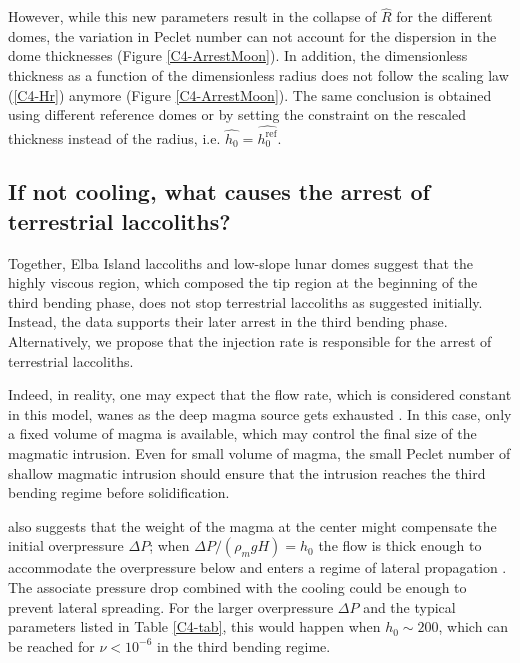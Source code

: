 However, while this new parameters result in the collapse of $\hat{R}$
for  the different  domes,  the  variation in  Peclet  number can  not
account   for  the   dispersion  in   the  dome   thicknesses  (Figure
\ref{C4-ArrestMoon}).  In  addition, the dimensionless thickness  as a
function of the  dimensionless radius does not follow  the scaling law
(\ref{C4-Hr})   anymore   (Figure  \ref{C4-ArrestMoon}).    The   same
conclusion is obtained  using different reference domes  or by setting
the constraint on  the rescaled thickness instead of  the radius, i.e.
$\hat{h_0}=\hat{h_0^{\text{ref}}}$.

\subsection{If  not cooling,  what  causes the  arrest of  terrestrial
  laccoliths?}
\label{sec:large-mafic-sill}

Together,  Elba Island  laccoliths and  low-slope lunar  domes suggest
that the highly  viscous region, which composed the tip  region at the
beginning  of  the third  bending  phase,  does not  stop  terrestrial
laccoliths as  suggested initially.  Instead, the  data supports their
later arrest  in the  third bending  phase. Alternatively,  we propose
that the injection  rate is responsible for the  arrest of terrestrial
laccoliths.

Indeed,  in reality,  one  may expect  that the  flow  rate, which  is
considered constant in this model, wanes as the deep magma source gets
exhausted \citep{Taisne:2009va,Rivalta:2010em}.  In  this case, only a
fixed volume of  magma is available, which may control  the final size
of the magmatic intrusion.  Even for  small volume of magma, the small
Peclet number  of shallow  magmatic intrusion  should ensure  that the
intrusion reaches the third bending regime before solidification.

\citet{Michaut:2011kg} also suggests  that the weight of  the magma at
the center might compensate the  initial overpressure $\Delta P$; when
$\Delta P/(\rho_m  g H)=h_0$ the  flow is thick enough  to accommodate
the  overpressure below  and enters  a regime  of lateral  propagation
\citep{Michaut:2011kg}. The associate pressure  drop combined with the
cooling could be enough to  prevent lateral spreading.  For the larger
overpressure $\Delta  P$ and  the typical  parameters listed  in Table
\ref{C4-tab},  this would  happen  when $h_0\sim  200$,  which can  be
reached for $\nu<10^{-6}$ in the third bending regime.

